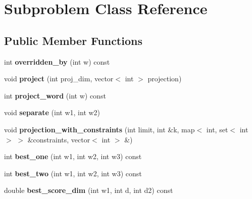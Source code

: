\hypertarget{classSubproblem}{
\section{Subproblem Class Reference}
\label{classSubproblem}
}
\subsection*{Public Member Functions}
\begin{DoxyCompactItemize}
\item 
\hypertarget{classSubproblem_a1f76e6e7b079168299046c42e484c9cf}{
int {\bfseries overridden\_\-by} (int w) const }
\label{classSubproblem_a1f76e6e7b079168299046c42e484c9cf}

\item 
\hypertarget{classSubproblem_aba36ea76049a46e9ba1f0ac3ccec540a}{
void {\bfseries project} (int proj\_\-dim, vector$<$ int $>$ projection)}
\label{classSubproblem_aba36ea76049a46e9ba1f0ac3ccec540a}

\item 
\hypertarget{classSubproblem_a7c86b92cc388505602707376e52a0804}{
int {\bfseries project\_\-word} (int w) const }
\label{classSubproblem_a7c86b92cc388505602707376e52a0804}

\item 
\hypertarget{classSubproblem_a3f6d78f4567e70c35785d27a53a55490}{
void {\bfseries separate} (int w1, int w2)}
\label{classSubproblem_a3f6d78f4567e70c35785d27a53a55490}

\item 
\hypertarget{classSubproblem_a503126c48810484433fd6c3e428f6537}{
void {\bfseries projection\_\-with\_\-constraints} (int limit, int \&k, map$<$ int, set$<$ int $>$ $>$ \&constraints, vector$<$ int $>$ \&)}
\label{classSubproblem_a503126c48810484433fd6c3e428f6537}

\item 
\hypertarget{classSubproblem_a4c12e798de9d3e96d6935bd755f92a97}{
int {\bfseries best\_\-one} (int w1, int w2, int w3) const }
\label{classSubproblem_a4c12e798de9d3e96d6935bd755f92a97}

\item 
\hypertarget{classSubproblem_abf452bcac2a8a28adbdbffe402e64dde}{
int {\bfseries best\_\-two} (int w1, int w2, int w3) const }
\label{classSubproblem_abf452bcac2a8a28adbdbffe402e64dde}

\item 
\hypertarget{classSubproblem_a80e4996ec87d5c3501ef10abdd953260}{
double {\bfseries best\_\-score\_\-dim} (int w1, int d, int d2) const }
\label{classSubproblem_a80e4996ec87d5c3501ef10abdd953260}


\end{DoxyCompactItemize}
